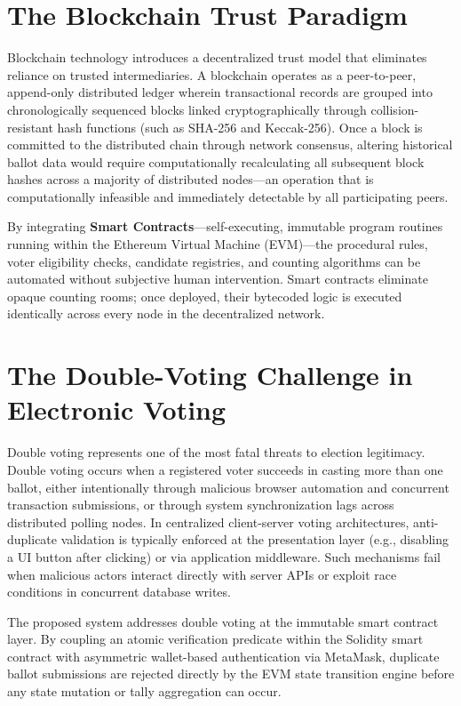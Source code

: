 \documentclass[12pt,a4paper]{report}
\begin{document}
\section{The Blockchain Trust Paradigm}
Blockchain technology introduces a decentralized trust model that eliminates reliance on trusted intermediaries. A blockchain operates as a peer-to-peer, append-only distributed ledger wherein transactional records are grouped into chronologically sequenced blocks linked cryptographically through collision-resistant hash functions (such as SHA-256 and Keccak-256). Once a block is committed to the distributed chain through network consensus, altering historical ballot data would require computationally recalculating all subsequent block hashes across a majority of distributed nodes---an operation that is computationally infeasible and immediately detectable by all participating peers.

By integrating \textbf{Smart Contracts}---self-executing, immutable program routines running within the Ethereum Virtual Machine (EVM)---the procedural rules, voter eligibility checks, candidate registries, and counting algorithms can be automated without subjective human intervention. Smart contracts eliminate opaque counting rooms; once deployed, their bytecoded logic is executed identically across every node in the decentralized network.

\section{The Double-Voting Challenge in Electronic Voting}
Double voting represents one of the most fatal threats to election legitimacy. Double voting occurs when a registered voter succeeds in casting more than one ballot, either intentionally through malicious browser automation and concurrent transaction submissions, or through system synchronization lags across distributed polling nodes. In centralized client-server voting architectures, anti-duplicate validation is typically enforced at the presentation layer (e.g., disabling a UI button after clicking) or via application middleware. Such mechanisms fail when malicious actors interact directly with server APIs or exploit race conditions in concurrent database writes.

The proposed system addresses double voting at the immutable smart contract layer. By coupling an atomic verification predicate within the Solidity smart contract with asymmetric wallet-based authentication via MetaMask, duplicate ballot submissions are rejected directly by the EVM state transition engine before any state mutation or tally aggregation can occur.
\end{document}
